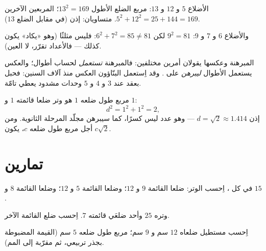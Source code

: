 \begin{example}\label{ex:g8:pythagoras:test}
الأضلاع $5$ و $12$ و $13$: مربع الضلع الأطول $13^2 = 169$؛ 
المربعين الآخرين $5^2 + 12^2 = 25 + 144 = 169$. متساويان: إذن 
(في مقابل الضلع $13$).

والأضلاع $6$ و $7$ و $9$: $9^2 = 81$ لكن $6^2 + 7^2 = 85 \neq 81$: فليس
مثلثًا  (وهو «يكاد» يكون كذلك --- فالأعداد تقرّر، لا
العين).
\end{example}

\begin{remark}
المبرهنة وعكسها يقولان أمرين مختلفين: فالمبرهنة
\emph{تستعمل}  لحساب أطوال؛ والعكس يستعمل
الأطوال \emph{ليبرهن} على . وقد اِستعمل البنّاؤون
العكس منذ آلاف السنين: فحبل بعقد عند $3$ و $4$ و $5$ وحدات
مشدود يعطي  تامّة.
\end{remark}

\begin{example}\label{ex:g8:pythagoras:diagonal}
 مربع طول ضلعه $1$ هو وتر  ضلعا قائمته $1$ و $1$:
\[
d^2 = 1^2 + 1^2 = 2 ,
\]
إذن $d = \sqrt2 \approx 1.414$ --- وهو عدد ليس كسرًا، كما
سيبرهن مجلّد المرحلة الثانوية. ومن أجل مربع طول ضلعه $c$، يكون
 $c\sqrt2$.
\end{example}

\section{تمارين}

\begin{exercise}[$\star$]\label{exo:g8:pythagoras:1}
في كل ، اِحسب الوتر:
ضلعا القائمة $9$ و $12$؛ \quad وضلعا القائمة $5$ و $12$؛ \quad وضلعا القائمة $8$ و $15$.
\end{exercise}

\begin{exercise}[$\star$]\label{exo:g8:pythagoras:2}
 وتره $25$ وأحد ضلعَي قائمته $7$. اِحسب
ضلع القائمة الآخر.
\end{exercise}

\begin{exercise}[$\star$]\label{exo:g8:pythagoras:3}
اِحسب  مستطيل ضلعاه $12$ سم و $9$ سم؛ 
مربع طول ضلعه $5$ سم (القيمة المضبوطة بجذر تربيعي،
ثم مقرّبة إلى المم).
\end{exercise}

